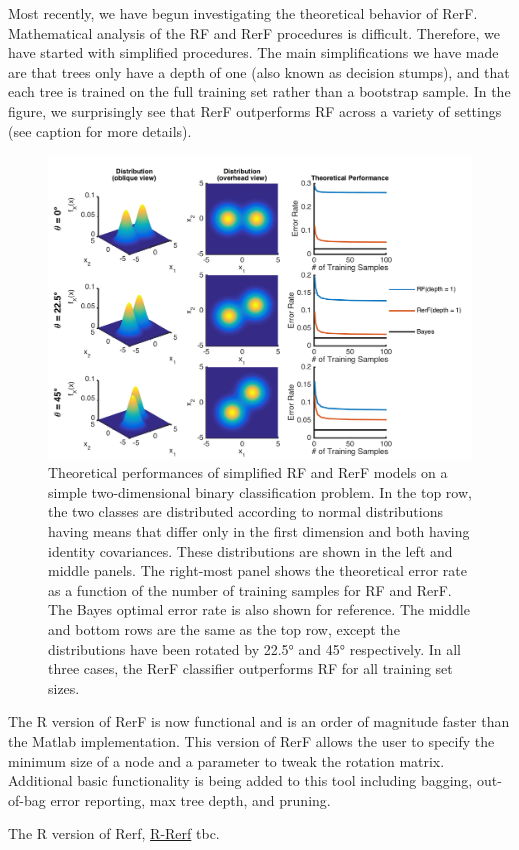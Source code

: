 \documentclass[simplex.tex]{subfiles}
\begin{document}
\clearpage
Most recently, we have begun investigating the theoretical behavior of RerF. Mathematical analysis of the RF and RerF procedures is difficult. Therefore, we have started with simplified procedures. The main simplifications we have made are that trees only have a depth of one (also known as decision stumps), and that each tree is trained on the full training set rather than a bootstrap sample. In the figure, we surprisingly see that RerF outperforms RF across a variety of settings (see caption for more details).

\begin{figure}[h!]
\begin{cframed}
\centering
\includegraphics[height=0.4\textheight]{../../figs/RerF_2017_03.png}
\caption{
Theoretical performances of simplified RF and RerF models on a simple two-dimensional binary classification problem. In the top row, the two classes are distributed according to normal distributions having means that differ only in the first dimension and both having identity covariances. These distributions are shown in the left and middle panels. The right-most panel shows the theoretical error  rate as a function of the number of training samples for RF and RerF. The Bayes optimal error rate is also shown for reference. The middle and bottom rows are the same as the top row, except the distributions have been rotated by 22.5° and 45° respectively. In all three cases, the RerF classifier outperforms RF for all training set sizes.
}
\label{fig:RerF}
\end{cframed}
\end{figure}

The R version of RerF is now functional and is an order of magnitude faster than the Matlab implementation.  This version of RerF allows the user to specify the minimum size of a node and a parameter to tweak the rotation matrix.  Additional basic functionality is being added to this tool including bagging, out-of-bag error reporting, max tree depth, and pruning.


\clearpage
The R version of Rerf, \href{https://github.com/neurodata/R-RerF}{R-Rerf} tbc.

\clearpage
\end{document}
